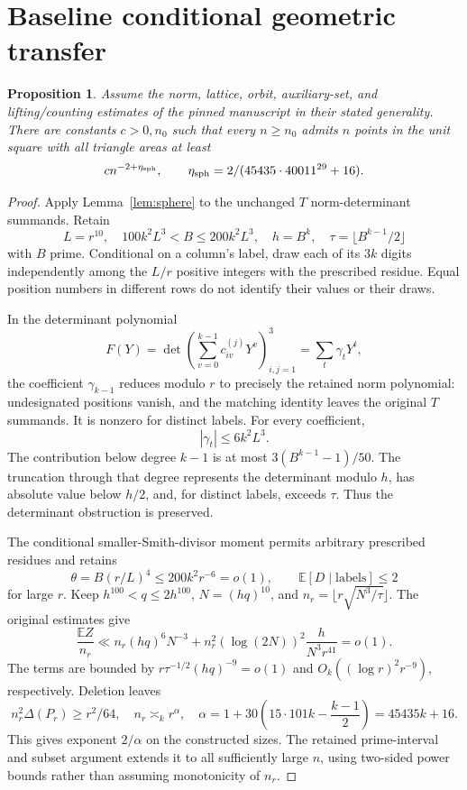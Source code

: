 \documentclass[11pt]{article}
\newtheorem{proposition}[lemma]{Proposition}
\begin{document}
\section{Baseline conditional geometric transfer}
\begin{proposition}
Assume the norm, lattice, orbit, auxiliary-set, and lifting/counting
estimates of the pinned manuscript in their stated generality.
There are constants \(c>0,n_0\) such that every \(n\ge n_0\) admits
\(n\) points in the unit square with all triangle areas at least
\[
 c n^{-2+\eta_{\rm sph}},\qquad
 \eta_{\rm sph}=2/(45435\cdot40011^{29}+16).
\]
\end{proposition}
\begin{proof}
Apply Lemma~\ref{lem:sphere} to the unchanged \(T\) norm-determinant
summands. Retain
\[
 L=r^{10},\quad100k^2L^3<B\le200k^2L^3,\quad
 h=B^k,\quad\tau=\lfloor B^{k-1}/2\rfloor
\]
with \(B\) prime. Conditional on a column's label, draw each of its
\(3k\) digits independently among the \(L/r\) positive integers with
the prescribed residue. Equal position numbers in different rows
do not identify their values or their draws.

In the determinant polynomial
\[
 F(Y)=\det\left(\sum_{v=0}^{k-1}c_{iv}^{(j)}Y^v\right)_{i,j=1}^3
     =\sum_t\gamma_tY^t,
\]
the coefficient \(\gamma_{k-1}\) reduces modulo \(r\) to precisely
the retained norm polynomial: undesignated positions vanish, and
the matching identity leaves the original \(T\) summands.
It is nonzero for distinct labels. For every coefficient,
\[
 |\gamma_t|\le6k^2L^3.
\]
The contribution below degree \(k-1\) is at most
\(3(B^{k-1}-1)/50\). The truncation through that degree represents
the determinant modulo \(h\), has absolute value below \(h/2\),
and, for distinct labels, exceeds \(\tau\). Thus the determinant
obstruction is preserved.

The conditional smaller-Smith-divisor moment permits arbitrary
prescribed residues and retains
\[
 \theta=B(r/L)^4\le200k^2r^{-6}=o(1),\qquad
 {\mathbb E}[D\mid\text{labels}]\le2
\]
for large \(r\). Keep \(h^{100}<q\le2h^{100}\), \(N=(hq)^{10}\), and
\(n_r=\lfloor r\sqrt{N^3/\tau}\rfloor\). The original estimates give
\[
 \frac{{\mathbb E}Z}{n_r}\ll
 n_r(hq)^6N^{-3}
 +n_r^2(\log(2N))^2\frac{h}{N^3r^{41}}=o(1).
\]
The terms are bounded by \(r\tau^{-1/2}(hq)^{-9}=o(1)\) and
\(O_k((\log r)^2r^{-9})\), respectively. Deletion leaves
\[
 n_r^2\Delta(P_r)\ge r^2/64,\quad n_r\asymp_k r^\alpha,\quad
 \alpha=1+30\left(15\cdot101k-\frac{k-1}{2}\right)=45435k+16.
\]
This gives exponent \(2/\alpha\) on the constructed sizes.
The retained prime-interval and subset argument extends it to all
sufficiently large \(n\), using two-sided power bounds rather than
assuming monotonicity of \(n_r\).
\end{proof}
\end{document}
